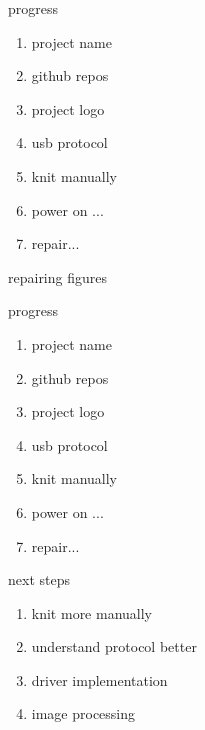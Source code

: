 \begin{frame}{progress}
    \begin{enumerate}
        \item project name \emojiCheck
        \item github repos \emojiCheck
        \item project logo \emojiCheck
        \item usb protocol \emojiCheck
        \item knit manually \emojiCheck
        \item power on ... \emojiFail \pause
        \item repair...
    \end{enumerate}
\end{frame}


\begin{frame}{repairing}
figures
\end{frame}


\begin{frame}{progress}
    \begin{enumerate}
        \item project name \emojiCheck
        \item github repos \emojiCheck
        \item project logo \emojiCheck
        \item usb protocol \emojiCheck
        \item knit manually \emojiCheck
        \item power on ... \emojiFail
        \item repair... \pause \emojiCheck
    \end{enumerate}
\end{frame}


\begin{frame}{next steps}
    \begin{enumerate}
        \item knit more manually
        \item understand protocol better
        \item driver implementation
        \item image processing
    \end{enumerate}
\end{frame}



